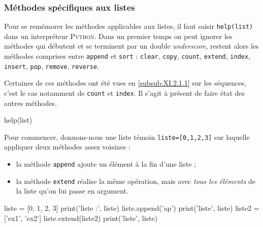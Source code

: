 \subsubsection[Méthodes spécifiques aux listes]{Méthodes spécifiques aux listes}
\label{subsub:XI.2.2.2}

Pour se remémorer les méthodes applicables aux listes, il faut saisir \texttt{help(list)} dans un interpréteur \textsc{Python}. Dans un premier temps on peut ignorer les méthodes qui débutent et se terminent par un double \textit{underscore}, restent alors les méthodes comprises entre \texttt{append} et \texttt{sort} : \texttt{clear}, \texttt{copy}, \texttt{count}, \texttt{extend}, \texttt{index}, \texttt{insert}, \texttt{pop}, \texttt{remove}, \texttt{reverse}. 

Certaines de ces méthodes ont été vues en \cref{subsub:XI.2.1.1} sur les séquences, c'est le cas notamment de \texttt{count} et \texttt{index}. Il s'agit à présent de faire état des autres méthodes.


\begin{idleconsole*}
\begin{pyconsole}[][breaklines]
help(list)
\end{pyconsole}
\end{idleconsole*}

\vspace{8pt}

Pour commencer, donnons-nous une liste témoin \texttt{liste=[0,1,2,3]} sur laquelle appliquer deux méthodes assez voisines :
\begin{itemize}
\item la méthode \texttt{append} ajoute un élément à la fin d'une liste ;
\item la méthode \texttt{extend} réalise la même opération, mais avec \emph{tous les éléments} de la liste qu'on lui passe en argument.
\end{itemize}

\vspace{2pt}

\begin{idleconsole}
\begin{pyconsole}
liste = [0, 1, 2, 3]
print('liste :', liste)
liste.append('ap')
print('liste', liste)
liste2 = ['ex1', 'ex2']
liste.extend(liste2)
print('liste', liste)
\end{pyconsole}
\end{idleconsole}


